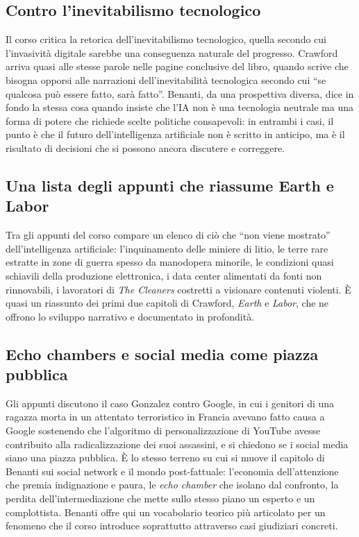 \documentclass[a4paper,11pt]{article}
\begin{document}
\subsection{Contro l'inevitabilismo tecnologico}

Il corso critica la retorica dell'inevitabilismo tecnologico, quella secondo cui l'invasività digitale sarebbe una conseguenza naturale del progresso. Crawford arriva quasi alle stesse parole nelle pagine conclusive del libro, quando scrive che bisogna opporsi alle narrazioni dell'inevitabilità tecnologica secondo cui ``se qualcosa può essere fatto, sarà fatto''. Benanti, da una prospettiva diversa, dice in fondo la stessa cosa quando insiste che l'IA non è una tecnologia neutrale ma una forma di potere che richiede scelte politiche consapevoli: in entrambi i casi, il punto è che il futuro dell'intelligenza artificiale non è scritto in anticipo, ma è il risultato di decisioni che si possono ancora discutere e correggere.

\subsection{Una lista degli appunti che riassume Earth e Labor}

Tra gli appunti del corso compare un elenco di ciò che ``non viene mostrato'' dell'intelligenza artificiale: l'inquinamento delle miniere di litio, le terre rare estratte in zone di guerra spesso da manodopera minorile, le condizioni quasi schiavili della produzione elettronica, i data center alimentati da fonti non rinnovabili, i lavoratori di \emph{The Cleaners} costretti a visionare contenuti violenti. È quasi un riassunto dei primi due capitoli di Crawford, \emph{Earth} e \emph{Labor}, che ne offrono lo sviluppo narrativo e documentato in profondità.

\subsection{Echo chambers e social media come piazza pubblica}

Gli appunti discutono il caso Gonzalez contro Google, in cui i genitori di una ragazza morta in un attentato terroristico in Francia avevano fatto causa a Google sostenendo che l'algoritmo di personalizzazione di YouTube avesse contribuito alla radicalizzazione dei suoi assassini, e si chiedono se i social media siano una piazza pubblica. È lo stesso terreno su cui si muove il capitolo di Benanti sui social network e il mondo post-fattuale: l'economia dell'attenzione che premia indignazione e paura, le \emph{echo chamber} che isolano dal confronto, la perdita dell'intermediazione che mette sullo stesso piano un esperto e un complottista. Benanti offre qui un vocabolario teorico più articolato per un fenomeno che il corso introduce soprattutto attraverso casi giudiziari concreti.
\end{document}
